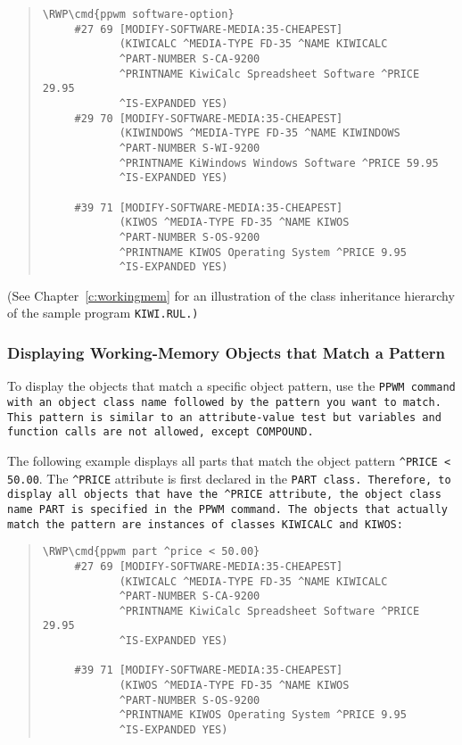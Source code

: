 \begin{quote}
\begin{Verbatim}[commandchars=\\\{\}]
\RWP\cmd{ppwm software-option}
     #27 69 [MODIFY-SOFTWARE-MEDIA:35-CHEAPEST]
            (KIWICALC ^MEDIA-TYPE FD-35 ^NAME KIWICALC
            ^PART-NUMBER S-CA-9200
            ^PRINTNAME KiwiCalc Spreadsheet Software ^PRICE 29.95
            ^IS-EXPANDED YES)
     #29 70 [MODIFY-SOFTWARE-MEDIA:35-CHEAPEST]
            (KIWINDOWS ^MEDIA-TYPE FD-35 ^NAME KIWINDOWS
            ^PART-NUMBER S-WI-9200
            ^PRINTNAME KiWindows Windows Software ^PRICE 59.95
            ^IS-EXPANDED YES)

     #39 71 [MODIFY-SOFTWARE-MEDIA:35-CHEAPEST]
            (KIWOS ^MEDIA-TYPE FD-35 ^NAME KIWOS 
            ^PART-NUMBER S-OS-9200
            ^PRINTNAME KIWOS Operating System ^PRICE 9.95 
            ^IS-EXPANDED YES)
\end{Verbatim}
\end{quote}

(See Chapter~\ref{c:workingmem} for an illustration of the class
inheritance hierarchy of the sample program \tt{KIWI.RUL}.)

\subsubsection{Displaying Working-Memory Objects that Match a Pattern}

To display the objects that match a specific object pattern, use the
\tt{PPWM} command with an object class name followed by the pattern
you want to match. This pattern is similar to an attribute-value test
but variables and function calls are not allowed, except
\tt{COMPOUND}.

The following example displays all parts that match the object pattern
\verb|^PRICE < 50.00|. The \verb|^PRICE| attribute is first declared
in the \tt{PART} class. Therefore, to display all objects that have
the \verb|^PRICE| attribute, the object class name \tt{PART} is
specified in the \tt{PPWM} command. The objects that actually match
the pattern are instances of classes \tt{KIWICALC} and \tt{KIWOS}:
\begin{quote}
\begin{Verbatim}[commandchars=\\\{\}]
\RWP\cmd{ppwm part ^price < 50.00}
     #27 69 [MODIFY-SOFTWARE-MEDIA:35-CHEAPEST]
            (KIWICALC ^MEDIA-TYPE FD-35 ^NAME KIWICALC 
            ^PART-NUMBER S-CA-9200
            ^PRINTNAME KiwiCalc Spreadsheet Software ^PRICE 29.95
            ^IS-EXPANDED YES)

     #39 71 [MODIFY-SOFTWARE-MEDIA:35-CHEAPEST]
            (KIWOS ^MEDIA-TYPE FD-35 ^NAME KIWOS 
            ^PART-NUMBER S-OS-9200
            ^PRINTNAME KIWOS Operating System ^PRICE 9.95
            ^IS-EXPANDED YES)
\end{Verbatim}
\end{quote}

